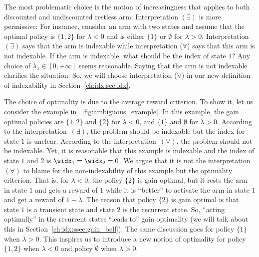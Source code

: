 The most problematic choice is the notion of increasingness that applies to both discounted and undiscounted restless arm: Interpretation $(\exists)$ is more permissive: For instance, consider an arm with two states and assume that the optimal policy is $\{1,2\}$ for $\lambda<0$ and is either $\{1\}$ or $\emptyset$ for $\lambda>0$.
Interpretation $(\exists)$ says that the arm is indexable while interpretation ($\forall$) says that this arm is not indexable.
If the arm is indexable, what should be the index of state $1$?
Any choice of $\lambda_1\in[0,+\infty]$ seems reasonable.
Saying that the arm is not indexable clarifies the situation.
So, we will choose interpretation ($\forall$) in our new definition of indexability in Section~\ref{ch:idx:sec:idx}.

The choice of optimality is due to the average reward criterion.
To show it, let us consider the example in \figurename~\ref{fig:ambiguous_example}.
In this example, the gain optimal policies are $\{1,2\}$ and $\{2\}$ for $\lambda<0$, and $\{1\}$ and $\emptyset$ for $\lambda>0$.
According to the interpretation~$(\exists)$, the problem should be indexable but the index for state $1$ is unclear.
According to the interpretation~$(\forall)$, the problem should not be indexable.
Yet, it is reasonable that this example is indexable and the index of state $1$ and $2$ is $\widx_1=\widx_2=0$.
We argue that it is not the interpretation~$(\forall)$ to blame for the non-indexability of this example but the optimality criterion.
That is, for $\lambda<0$, the policy $\{2\}$ is gain optimal, but it rests the arm in state $1$ and gets a reward of $1$ while it is ``better'' to activate the arm in state $1$ and get a reward of $1-\lambda$. 
The reason that policy $\{2\}$ is gain optimal is that state $1$ is a transient state and state $2$ is the recurrent state.
So, ``acting optimally'' in the recurrent states ``leads to'' gain optimality (we will talk about this in Section~\ref{ch:idx:ssec:gain_bell}).
The same discussion goes for policy $\{1\}$ when $\lambda>0$.
This inspires us to introduce a new notion of optimality for policy $\{1,2\}$ when $\lambda<0$ and policy $\emptyset$ when $\lambda>0$.

